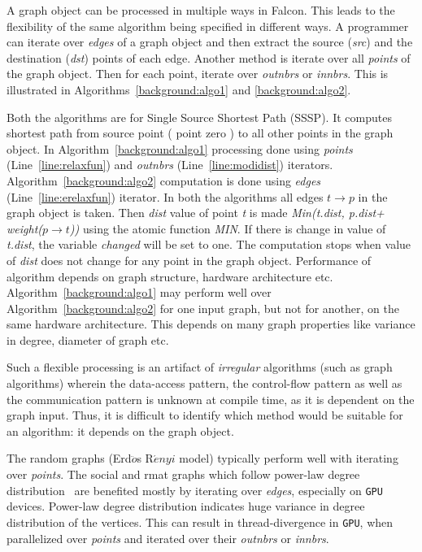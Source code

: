 \documentclass[12pt]{article}
\newcommand{\REM}[1]{}
\newcommand{\GPU}{\texttt{GPU}\xspace}
\begin{document}
A graph object can be processed in multiple ways in Falcon. This leads to the flexibility of the same algorithm being specified in different ways.   A programmer can iterate over {\it edges} of a graph object and then extract the source ({\it src}) and the destination ({\it dst}) points of each edge. Another method is iterate over all {\it points} of the graph object. 
Then for each point, iterate over {\it outnbrs} or {\it innbrs}.
This is illustrated in Algorithms~\ref{background:algo1} and \ref{background:algo2}.\par
Both the algorithms are for  Single Source Shortest Path (SSSP). It computes shortest path from source point ( point zero ) to all other points in the graph object. 
 In Algorithm~\ref{background:algo1}  processing done using {\it points} (Line~\ref{line:relaxfun}) and {\it outnbrs} (Line~\ref{line:modidist}) iterators. Algorithm~\ref{background:algo2} computation is done using {\it edges} (Line~\ref{line:erelaxfun}) iterator.
 In both the algorithms all edges $t\rightarrow p$ in the graph object is taken. Then {\it dist} value of point {\it t} is made {\it Min(t.dist, p.dist+ weight($p\rightarrow t$))} using the atomic function {\it MIN}. If there is change in value of {\it t.dist}, the variable {\it changed} will be set to one. The computation stops when value of {\it dist} does not change for any point in the graph object. Performance of algorithm depends on graph structure, hardware architecture etc.
 Algorithm~\ref{background:algo1} may perform well over Algorithm~\ref{background:algo2} for one input graph, but not for another, \REM{ input graph} on the same hardware architecture. This depends on many graph properties like variance in degree, diameter of graph etc.

Such a flexible processing is an artifact of \textit{irregular} algorithms (such as graph algorithms) wherein the data-access pattern, the control-flow pattern as well as the communication pattern is unknown at compile time, as it is dependent on the graph input.
 Thus, it is difficult to identify which method would be suitable for an algorithm:  it depends on the graph object.

The random graphs (Erd$\ddot{o}$s R$\acute{e}nyi$ model) typically perform well with iterating over {\it points}. The social and rmat graphs which follow power-law degree distribution~\cite{Gharaibeh:2012:YOT:2370816.2370866} are benefited mostly by iterating over {\it edges}, especially on \GPU devices.  Power-law degree distribution indicates huge variance in degree distribution of the vertices. This can result in thread-divergence in \GPU, when parallelized over {\it points} and iterated over their {\it outnbrs} or {\it innbrs}.  
\end{document}
